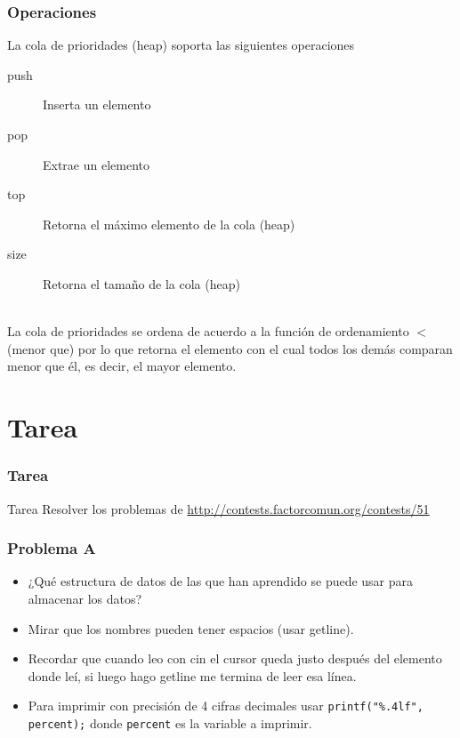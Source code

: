 \documentclass{beamer}
\begin{document}
	
	\begin{frame}
		\frametitle{Operaciones}
		La cola de prioridades (heap) soporta las siguientes operaciones
		\begin{description}
			\item [push] Inserta un elemento
			\item [pop] Extrae un elemento
			\item [top] Retorna el máximo elemento de la cola (heap)
			\item [size] Retorna el tamaño de la cola (heap)
		\end{description}
		\quad \\
		La cola de prioridades se ordena de acuerdo a la función de ordenamiento $<$ (menor que) por lo que retorna el elemento con el cual todos los demás comparan menor que él, es decir, el mayor elemento.
	\end{frame}
	
\section{Tarea}
	\begin{frame}
		\frametitle{Tarea}
		\begin{alertblock}{Tarea}
			Resolver los problemas de \url{http://contests.factorcomun.org/contests/51}
		\end{alertblock}
	\end{frame}
	
	\begin{frame}[fragile]
		\frametitle{Problema A}
		\begin{itemize}
			\item ¿Qué estructura de datos de las que han aprendido se puede usar para almacenar los datos?
			\item Mirar que los nombres pueden tener espacios (usar getline).
			\item Recordar que cuando leo con cin el cursor queda justo después del elemento donde leí, si luego hago getline me termina de leer esa línea.
			\item Para imprimir con precisión de 4 cifras decimales usar \verb|printf("%.4lf", percent);| donde \verb|percent| es la variable a imprimir.
		\end{itemize}
	\end{frame}
	
\end{document}
